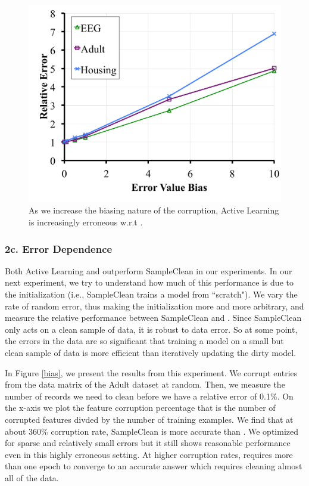 \begin{figure}[ht!]
\centering
 \includegraphics[width=0.6\columnwidth]{exp/exp10.pdf}
 \caption{As we increase the biasing nature of the corruption, Active Learning is increasingly erroneous w.r.t \sys. \label{albias}}
\end{figure}
\fi

\subsubsection{2c. Error Dependence}
Both Active Learning and \sys outperform SampleClean in our experiments.
In our next experiment, we try to understand how much of this performance 
is due to the initialization (i.e., SampleClean trains a model from ``scratch").
We vary the rate of random error, thus making the initialization more and more arbitrary, 
and measure the relative performance between SampleClean and \sys.
Since SampleClean only acts on a clean sample of data, it is robust to data error.
So at some point, the errors in the data are so significant that training a model on a small but clean sample of data is more efficient than iteratively updating the dirty model.

In Figure \ref{bias}, we present the results from this experiment.
We corrupt entries from the data matrix of the Adult dataset at random.
Then, we measure the number of records we need to clean before we have a relative error of 0.1\%.
On the x-axis we plot the feature corruption percentage that is the number of corrupted features divded by the number of training examples.
We find that at about 360\% corruption rate, SampleClean is more accurate than \sys.
We optimized \sys for sparse and relatively small errors but it still shows reasonable performance even in this highly erroneous setting. 
At higher corruption rates, \sys requires more than one epoch to converge to an accurate answer which requires cleaning almost all of the data.

